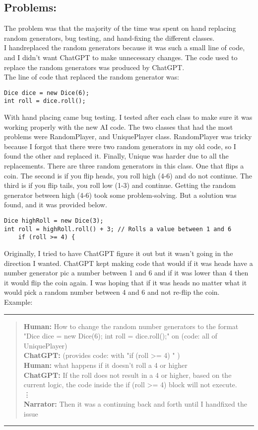 \documentclass[a4paper,11pt]{article}
\begin{document}
\subsection*{Problems:}
The problem was that the majority of the time was spent on hand replacing random generators, bug testing, and hand-fixing the different classes. \\
I hand\-replaced the random generators because it was such a small line of code, and I didn't want ChatGPT to make unnecessary changes. The code used to replace the random generators was produced by ChatGPT.\\
The line of code that replaced the random generator was:
\begin{lstlisting}
Dice dice = new Dice(6);
int roll = dice.roll();
\end{lstlisting} 
With hand placing came bug testing. I tested after each class to make sure it was working properly with the new AI code. The two classes that had the most problems were RandomPlayer, and UniquePlayer class. RandomPlayer was tricky because I forgot that there were two random generators in my old code, so I found the other and replaced it. Finally, Unique was harder due to all the replacements. There are three random generators in this class. One that flips a coin. The second is if you flip heads, you roll high (4-6) and do not continue. The third is if you flip tails, you roll low (1-3) and continue. Getting the random generator between high (4-6) took some problem-solving. But a solution was found, and it was provided below.
\begin{lstlisting}
Dice highRoll = new Dice(3);
int roll = highRoll.roll() + 3; // Rolls a value between 1 and 6
    if (roll >= 4) {
\end{lstlisting} 
Originally, I tried to have ChatGPT figure it out but it wasn't going in the direction I wanted. ChatGPT kept making code that would if it was heads have a number generator pic a number between 1 and 6 and if it was lower than 4 then it would flip the coin again. I was hoping that if it was heads no matter what it would pick a random number between 4 and 6 and not re-flip the coin. \\
Example:
\hrule
\vspace{4pt} %
\begin{quote}
\textbf{Human:} How to change the random number generators to the format "Dice dice = new Dice(6);
             int roll = dice.roll();" on (code: all of UniquePlayer) \\
\textbf{ChatGPT:} (provides code: with "if (roll >= 4) " ) \\
\textbf{Human:} what happens if it doesn't roll a 4 or higher \\
\textbf{ChatGPT:} If the roll does not result in a 4 or higher, based on the current logic, the code inside the if (roll >= 4) block will not execute.\\
\vdots\\
\textbf{Narrator:} Then it was a continuing back and forth until I hand\-fixed the issue \\
\end{quote}
\hrule
\vspace{4pt} %
\end{document}
